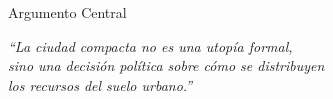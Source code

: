 \begin{frame}{Argumento Central}
  \vfill
  \begin{center}
    \color{ColorPrincipal}
    \Large\itshape
    ``La ciudad compacta no es una utopía formal,\\
    sino una decisión política sobre cómo se distribuyen\\
    los recursos del suelo urbano.''
  \end{center}
  \vfill
\end{frame}